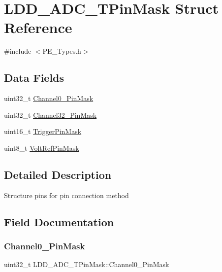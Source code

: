 \hypertarget{struct_l_d_d___a_d_c___t_pin_mask}{}\section{L\+D\+D\+\_\+\+A\+D\+C\+\_\+\+T\+Pin\+Mask Struct Reference}
\label{struct_l_d_d___a_d_c___t_pin_mask}


{\ttfamily \#include $<$P\+E\+\_\+\+Types.\+h$>$}

\subsection*{Data Fields}
\begin{DoxyCompactItemize}
\item 
uint32\+\_\+t \hyperlink{struct_l_d_d___a_d_c___t_pin_mask_a66d94f79f603c74c93540553a49bbf3f}{Channel0\+\_\+Pin\+Mask}
\item 
uint32\+\_\+t \hyperlink{struct_l_d_d___a_d_c___t_pin_mask_acd6bf6f512fb6e8cd170188dc663a4d8}{Channel32\+\_\+Pin\+Mask}
\item 
uint16\+\_\+t \hyperlink{struct_l_d_d___a_d_c___t_pin_mask_a004a4d3a4f4071684e6676f64322215f}{Trigger\+Pin\+Mask}
\item 
uint8\+\_\+t \hyperlink{struct_l_d_d___a_d_c___t_pin_mask_a556430a91304e7db634bda25091b892c}{Volt\+Ref\+Pin\+Mask}
\end{DoxyCompactItemize}


\subsection{Detailed Description}
Structure pins for pin connection method 

\subsection{Field Documentation}
\mbox{\label{struct_l_d_d___a_d_c___t_pin_mask_a66d94f79f603c74c93540553a49bbf3f}} 
\subsubsection{\texorpdfstring{Channel0\+\_\+Pin\+Mask}{Channel0\_31PinMask}}
{\footnotesize\ttfamily uint32\+\_\+t L\+D\+D\+\_\+\+A\+D\+C\+\_\+\+T\+Pin\+Mask\+::\+Channel0\+\_\+Pin\+Mask}

